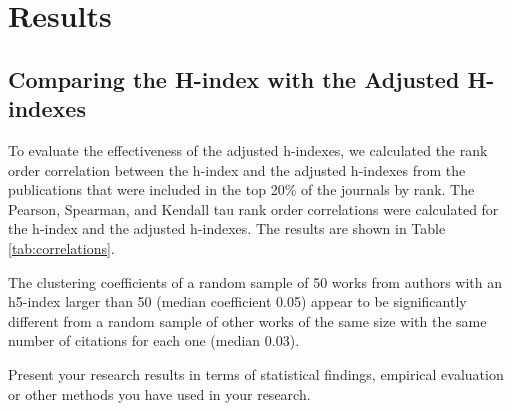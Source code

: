 \chapter{Results}
\label{ch:results}

\section{Comparing the H-index with the Adjusted H-indexes}

To evaluate the effectiveness of the adjusted h-indexes, we calculated the rank order correlation
between the h-index and the adjusted h-indexes from the publications that were included in the
top 20\% of the journals by rank. The Pearson, Spearman, and Kendall tau rank order correlations
were calculated for the h-index and the adjusted h-indexes. The results are shown in Table
\ref{tab:correlations}.





The clustering coefficients of a random sample of 50 works from authors with an
h5-index larger than 50 (median coefficient 0.05) appear to be significantly different from a random
sample of other works of the same size with the same number of citations for each one
(median 0.03).


Present your research results in terms of statistical findings,
empirical evaluation or other methods you have used in your research.
